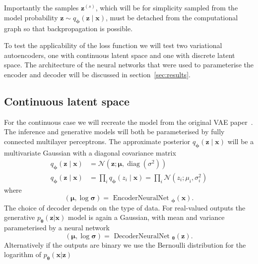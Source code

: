 \documentclass[final,3p,times,twocolumn]{elsarticle}
\begin{document}
Importantly the samples $\mathbf{z}^{(s)}$, which will be for simplicity sampled from the model probability $\mathbf{z} \sim  q_{\boldsymbol{\phi}}(\mathbf{z} \mid \mathbf{x})$, must be detached from the computational graph so that backpropagation is possible. 

To test the applicability of the loss function we will test two variational autoencoders, one with continuous latent space and one with discrete latent space. The architecture of the neural networks that were used to parameterise the encoder and decoder will be discussed in section~\ref{sec:results}.

\subsection{Continuous latent space}
\label{subsec:continuous}
For the continuous case we will recreate the model from the original VAE paper~\cite{kingma2013auto}. The inference and generative models will both be parameterised by fully connected multilayer perceptrons. The approximate posterior $q_{\boldsymbol{\phi}}(\mathbf{z} \mid \mathbf{x})$ will be a multivariate Gaussian with a diagonal covariance matrix
\begin{equation}
	\label{eq:gaussian}
	\begin{aligned}
		q_{\boldsymbol{\phi}}(\mathbf{z} \mid \mathbf{x}) &=\mathcal{N}\left(\mathbf{z} ; \boldsymbol{\mu},  \operatorname{diag}\left(\sigma^{2}\right)\right) \\
		q_{\boldsymbol{\phi}}(\mathbf{z} \mid \mathbf{x}) & =\prod_{i} q_{\boldsymbol{\phi}}\left(z_{i} \mid \mathbf{x}\right)=\prod_{i} \mathcal{N}\left(z_{i} ; \mu_{i}, \sigma_{i}^{2}\right)
	\end{aligned}
\end{equation}
where
\begin{equation}
	(\boldsymbol{\mu}, \log \boldsymbol{\sigma})=\text { EncoderNeuralNet }_{\boldsymbol{\phi}}(\mathbf{x}).
\end{equation}
The choice of decoder depends on the type of data. For real-valued outputs the generative $p_{\boldsymbol{\theta}}(\mathbf{z} | \mathbf{x})$ model is again a Gaussian, with mean and variance parameterised by a neural network
\begin{equation}
	(\boldsymbol{\mu}, \log \boldsymbol{\sigma})=\text { DecoderNeuralNet }_{\boldsymbol{\theta}}(\mathbf{z}).
\end{equation}
Alternatively if the outputs are binary we use the Bernoulli distribution for the logarithm of $p_{\boldsymbol{\theta}}(\mathbf{x} | \mathbf{z})$
\end{document}
